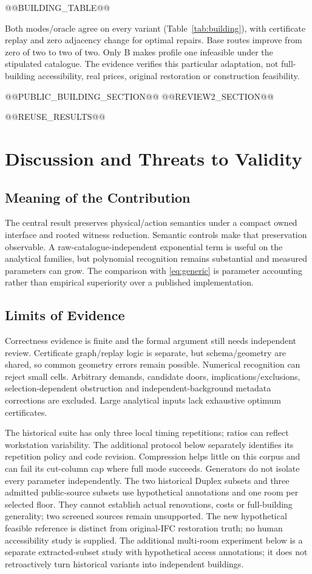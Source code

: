 \documentclass[conference]{IEEEtran}
\begin{document}
@@BUILDING_TABLE@@

Both modes/oracle agree on every variant (Table~\ref{tab:building}), with certificate replay and zero adjacency change for optimal repairs. Base routes improve from zero of two to two of two. Only B makes profile one infeasible under the stipulated catalogue. The evidence verifies this particular adaptation, not full-building accessibility, real prices, original restoration or construction feasibility.

@@PUBLIC_BUILDING_SECTION@@
@@REVIEW2_SECTION@@

@@REUSE_RESULTS@@

\section{Discussion and Threats to Validity}
\subsection{Meaning of the Contribution}
The central result preserves physical/action semantics under a compact owned interface and rooted witness reduction. Semantic controls make that preservation observable. A raw-catalogue-independent exponential term is useful on the analytical families, but polynomial recognition remains substantial and measured parameters can grow. The comparison with \eqref{eq:generic} is parameter accounting rather than empirical superiority over a published implementation.

\subsection{Limits of Evidence}
Correctness evidence is finite and the formal argument still needs independent review. Certificate graph/replay logic is separate, but schema/geometry are shared, so common geometry errors remain possible. Numerical recognition can reject small cells. Arbitrary demands, candidate doors, implications/exclusions, selection-dependent obstruction and independent-background metadata corrections are excluded. Large analytical inputs lack exhaustive optimum certificates.

The historical suite has only three local timing repetitions; ratios can reflect workstation variability. The additional protocol below separately identifies its repetition policy and code revision. Compression helps little on this corpus and can fail its cut-column cap where full mode succeeds. Generators do not isolate every parameter independently. The two historical Duplex subsets and three admitted public-source subsets use hypothetical annotations and one room per selected floor. They cannot establish actual renovations, costs or full-building generality; two screened sources remain unsupported. The new hypothetical feasible reference is distinct from original-IFC restoration truth; no human accessibility study is supplied. The additional multi-room experiment below is a separate extracted-subset study with hypothetical access annotations; it does not retroactively turn historical variants into independent buildings.
\end{document}
